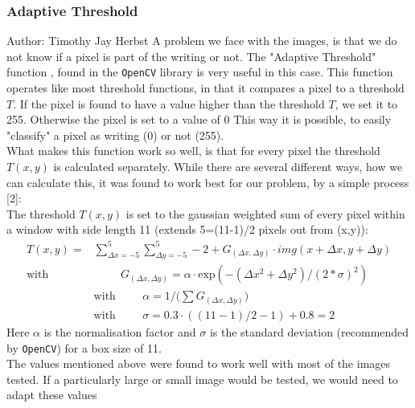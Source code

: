 \documentclass[12pt]{article}
\begin{document}
	\subsubsection{Adaptive Threshold} %
	\small{Author: Timothy Jay Herbst} \newline \newline
	A problem we face with the images, is that we do not know if a pixel is part of the writing or not.
	The "Adaptive Threshold" function \cite{adaThresh}, found in the \texttt{OpenCV} library is very useful in this case. %
	This function operates like most threshold functions, in that it compares a pixel to a threshold $T$.
	If the pixel is found to have a value higher than the threshold $T$, we set it to 255.
	Otherwise the pixel is set to a value of 0 \cite{cvAdaThresh}
	This way it is possible, to easily "classify" a pixel as writing (0) or not (255).\\
	What makes this function work so well, is that for every pixel the threshold $T(x,y)$ is calculated separately.
	While there are several different ways, how we can calculate this, it was found to work best for our problem, by a simple process [2]:\\
	The threshold $T(x,y)$ is set to the gaussian weighted sum of every pixel within a window with side length 11 (extends 5=(11-1)/2 pixels out from (x,y)):
	\begin{align}
	T(x,y)=&\sum_{\Delta x=-5}^{5}\sum_{\Delta y=-5}^{5} -2 + G_{(\Delta x,\Delta y)} \cdot img(x+\Delta x,y+\Delta y)\\
	\mathrm{with}& \hspace{1cm} G_{(\Delta x,\Delta y)} = \alpha \cdot \mathrm{exp}(-(\Delta x ^2 +\Delta y^2)/(2*\sigma)^2)\\ %
	&\mathrm{with} \hspace{1cm}\alpha = 1/\Big(\sum G_{(\Delta x,\Delta y)}\Big)\\
	&\mathrm{with} \hspace{1cm}\sigma = 0.3 \cdot ((11-1)/2-1) + 0.8 = 2
	\end{align}
	Here $\alpha$ is the normalisation factor and $\sigma$ is the  standard deviation (recommended by \texttt{OpenCV}) for a box size of 11.\\
	The values mentioned above were found to work well with most of the images tested.
	If a particularly large or small image would be tested, we would need to adapt these values
	
\end{document}
